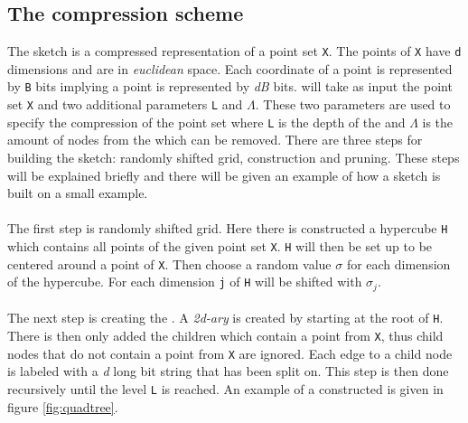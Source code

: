 \subsection{The \qs{} compression scheme}
\label{qs}
The sketch is a compressed representation of a point set \texttt{X}. The points of \texttt{X} have \texttt{d} dimensions and are in \textit{euclidean} space. Each coordinate of a point is represented by \texttt{B} bits implying a point is represented by \textit{dB} bits. \qs{} will take as input the point set \texttt{X} and two additional parameters \texttt{L} and $\Lambda$. These two parameters are used to specify the compression of the point set where \texttt{L} is the depth of the \qt{} and $\Lambda$ is the amount of nodes from the \qt{} which can be removed. 
There are three steps for building the sketch: randomly shifted grid, \qt{} construction and pruning. These steps will be explained briefly and there will be given an example of how a sketch is built on a small example.
\\
\\
The first step is randomly shifted grid. Here there is constructed a hypercube \texttt{H} which contains all points of the given point set \texttt{X}. \texttt{H} will then be set up to be centered around a point of \texttt{X}. Then choose a random value $\sigma$ for each dimension of the hypercube. For each dimension \texttt{j} of \texttt{H} will be shifted with $\sigma_j$.
\\
\\
The next step is creating the \qt{}. A \textit{2d-ary} \qt{} is created by starting at the root of \texttt{H}. There is then only added the children which contain a point from \texttt{X}, thus child nodes that do not contain a point from \texttt{X} are ignored. Each edge to a child node is labeled with a \textit{d} long bit string that has been split on. This step is then done recursively until the level \texttt{L} is reached. An example of a constructed \qt{} is given in figure \ref{fig:quadtree}.

